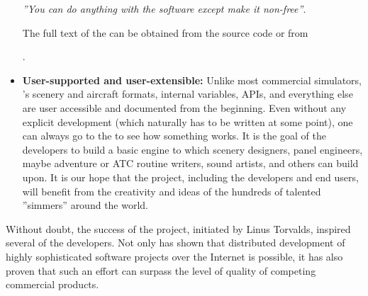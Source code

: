 \begin{itemize}
\centerline{\textit{''You can do anything with the software except make it non-free''}.}

The full text of the  can be obtained from the \FlightGear{} source code or from
 \medskip

.
 \medskip

\item\textbf{User-supported and user-extensible:}
   Unlike most commercial simulators,
  \FlightGear{}'s scenery and aircraft formats, internal variables, APIs, and everything
  else are user accessible and documented from the beginning. Even without any explicit
  development  (which naturally has to be written at some point),
  one can always go to the  to see how something works. It is the
  goal of the developers to build a basic engine to which scenery designers, panel
  engineers, maybe adventure or ATC routine writers, sound artists, and others can build
  upon. It is our hope that the project, including the developers and end users, will
  benefit from the creativity and ideas of the hundreds of talented ''simmers'' around
  the world.
\end{itemize}

  Without doubt, the success of the  project, initiated by Linus
  Torvalds, inspired several of the developers.
  Not only has  shown that distributed development of highly
  sophisticated software projects over the Internet is possible, it has also
  proven that such an effort can surpass the level of quality of competing
  commercial products.
\medskip

 \centerline{}

